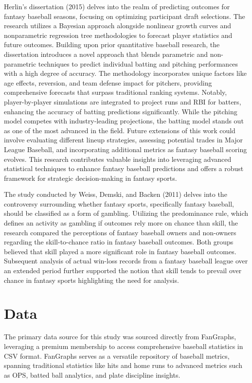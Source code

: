 \documentclass[12pt, english]{article}
\begin{document}
Herlin's dissertation (2015) delves into the realm of predicting outcomes for fantasy baseball seasons, focusing on optimizing participant draft selections. The research utilizes a Bayesian approach alongside nonlinear growth curves and nonparametric regression tree methodologies to forecast player statistics and future outcomes. Building upon prior quantitative baseball research, the dissertation introduces a novel approach that blends parametric and non-parametric techniques to predict individual batting and pitching performances with a high degree of accuracy. The methodology incorporates unique factors like age effects, reversion, and team defense impact for pitchers, providing comprehensive forecasts that surpass traditional ranking systems. Notably, player-by-player simulations are integrated to project runs and RBI for batters, enhancing the accuracy of batting predictions significantly. While the pitching model competes with industry-leading projections, the batting model stands out as one of the most advanced in the field. Future extensions of this work could involve evaluating different lineup strategies, assessing potential trades in Major League Baseball, and incorporating additional metrics as fantasy baseball scoring evolves. This research contributes valuable insights into leveraging advanced statistical techniques to enhance fantasy baseball predictions and offers a robust framework for strategic decision-making in fantasy sports.

The study conducted by Weiss, Demski, and Backen (2011) delves into the controversy surrounding whether fantasy sports, specifically fantasy baseball, should be classified as a form of gambling. Utilizing the predominance rule, which defines an activity as gambling if outcomes rely more on chance than skill, the research compared the perceptions of fantasy baseball owners and non-owners regarding the skill-to-chance ratio in fantasy baseball outcomes. Both groups believed that skill played a more significant role in fantasy baseball outcomes. Subsequent analysis of actual win-loss records from a fantasy baseball league over an extended period further supported the notion that skill tends to prevail over chance in fantasy sports highlighting the need for analysis.

\section{Data}

The primary data source for this study was sourced directly from FanGraphs, leveraging a premium membership to access comprehensive baseball statistics in CSV format. FanGraphs serves as a versatile repository of baseball metrics, spanning traditional statistics like hits and home runs to advanced metrics such as OPS, batted ball analytics, and plate discipline insights.
\end{document}
